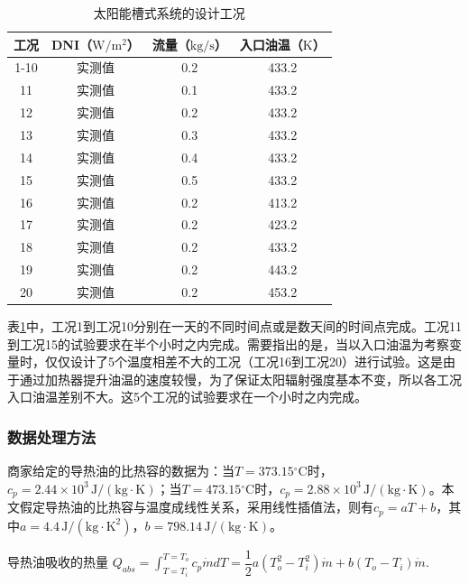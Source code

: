 \begin{table}[htbp]\footnotesize
	\caption{太阳能槽式系统的设计工况}
	\begin{center}
	\begin{tabular}{cccc}
		\toprule
		工况	& DNI（$\mathrm{W/m^2}$）&	流量（$\mathrm{kg/s}$）			&	入口油温（$\mathrm{K}$）\\
		\midrule
		1-10	&	实测值	&	0.2	&	433.2\\
		11	&	实测值	&	0.1	&	433.2\\
		12	&	实测值	&	0.2	&	433.2\\
		13	&	实测值	&	0.3	&	433.2\\
		14	&	实测值	&	0.4	&	433.2\\
		15	&	实测值	&	0.5	&	433.2\\
		16	&	实测值	&	0.2	&	413.2\\
		17	&	实测值	&	0.2	&	423.2\\
		18	&	实测值	&	0.2	&	433.2\\
		19	&	实测值	&	0.2	&	443.2\\
		20	&	实测值	&	0.2	&	453.2\\
		\bottomrule
	\end{tabular}
	\end{center}
	\label{tab:DesignedCasesForTrough}
\end{table}

表\ref{tab:DesignedCasesForTrough}中，工况1到工况10分别在一天的不同时间点或是数天间的时间点完成。工况11到工况15的试验要求在半个小时之内完成。需要指出的是，当以入口油温为考察变量时，仅仅设计了5个温度相差不大的工况（工况16到工况20）进行试验。这是由于通过加热器提升油温的速度较慢，为了保证太阳辐射强度基本不变，所以各工况入口油温差别不大。这5个工况的试验要求在一个小时之内完成。

\subsubsection{数据处理方法}
商家给定的导热油的比热容的数据为：当$T = 373.15\mathrm{^\circ C}$时，$c_p = 2.44\times10^3\,\mathrm{J/(kg\cdot K)}$；当$T = 473.15\mathrm{^\circ C}$时，$c_p = 2.88\times10^3\,\mathrm{J/(kg\cdot K)}$。本文假定导热油的比热容与温度成线性关系，采用线性插值法，则有$c_p = aT + b$，其中$a = 4.4\,\mathrm{J/(kg \cdot K^2)}$，$b = 798.14\,\mathrm{J/(kg\cdot K)}$。

导热油吸收的热量 $Q_{abs} = \int_{T=T_i}^{T = T_o}c_p\dot{m}dT = \dfrac{1}{2}a(T_o^2 - T_i^2)\dot{m} + b (T_o - T_i)\dot{m}$.

